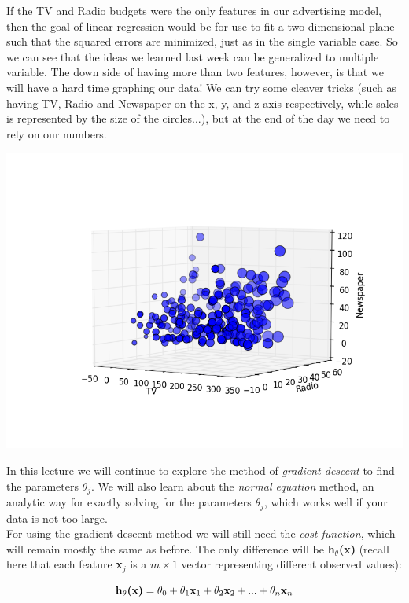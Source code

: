 \documentclass[11pt,a4paper,oneside]{report}
\begin{document}
If the TV and Radio budgets were the only features in our advertising model, then the goal of linear regression would be for use to fit a two dimensional plane such that the squared errors are minimized, just as in the single variable case. So we can see that the ideas we learned last week can be generalized to multiple variable. The down side of having more than two features, however, is that we will have a hard time graphing our data! We can try some cleaver tricks (such as having TV, Radio and Newspaper on the x, y, and z axis respectively, while sales is represented by the size of the circles...), but at the end of the day we need to rely on our numbers.
\begin{center}
\includegraphics[scale=.5]{scatter4d.png}
\end{center}

In this lecture we will continue to explore the method of \emph{gradient descent} to find the parameters $\theta_j$. We will also learn about the \emph{normal equation} method, an analytic way for exactly solving for the parameters $\theta_j$, which works well if your data is not too large.\\

For using the gradient descent method we will still need the \emph{cost function}, which will remain mostly the same as before. The only difference will be {\bf h$_{\theta}$(x)} (recall here that each feature {\bf x}$_j$ is a $m \times 1$ vector representing different observed values):

\[
\textnormal{{\bf h$_{\theta}$(x)}} = \theta_0 +
\theta_1 \textnormal{{\bf x}}_1 +
\theta_2 \textnormal{{\bf x}}_2 + ... +
\theta_n \textnormal{{\bf x}}_n
\]
\end{document}
